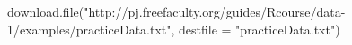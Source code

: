 \begin{Schunk}
\begin{Sinput}
  download.file("http://pj.freefaculty.org/guides/Rcourse/data-1/examples/practiceData.txt", destfile = "practiceData.txt")
\end{Sinput}
\end{Schunk}
